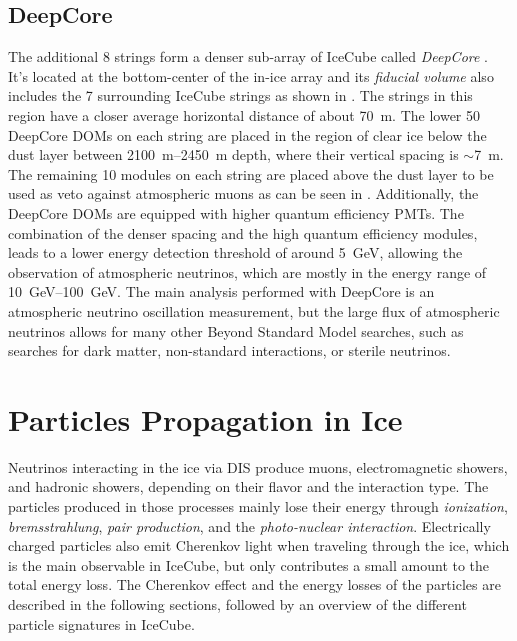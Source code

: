 

\subsection{DeepCore}

The additional 8 strings form a denser sub-array of IceCube called \textit{DeepCore} . It's located at the bottom-center of the in-ice array and its \textit{fiducial volume} also includes the 7 surrounding IceCube strings as shown in . The strings in this region have a closer average horizontal distance of about \SI{70}{\metre}. The lower 50 DeepCore DOMs on each string are placed in the region of clear ice below the dust layer between \SIrange{2100}{2450}{\metre} depth, where their vertical spacing is $\sim$\SI{7}{\metre}. The remaining 10 modules on each string are placed above the dust layer to be used as veto against atmospheric muons as can be seen in . Additionally, the DeepCore DOMs are equipped with higher quantum efficiency PMTs. The combination of the denser spacing and the high quantum efficiency modules, leads to a lower energy detection threshold of around \SI{5}{GeV}, allowing the observation of atmospheric neutrinos, which are mostly in the energy range of \SIrange{10}{100}{\giga\electronvolt}. The main analysis performed with DeepCore is an atmospheric neutrino oscillation measurement, but the large flux of atmospheric neutrinos allows for many other Beyond Standard Model searches, such as searches for dark matter, non-standard interactions, or sterile neutrinos. 


\section{Particles Propagation in Ice} 

Neutrinos interacting in the ice via DIS produce muons, electromagnetic showers, and hadronic showers, depending on their flavor and the interaction type. The particles produced in those processes mainly lose their energy through \textit{ionization}, \textit{bremsstrahlung}, \textit{pair production}, and the \textit{photo-nuclear interaction}. Electrically charged particles also emit Cherenkov light when traveling through the ice, which is the main observable in IceCube, but only contributes a small amount to the total energy loss. The Cherenkov effect and the energy losses of the particles are described in the following sections, followed by an overview of the different particle signatures in IceCube.


